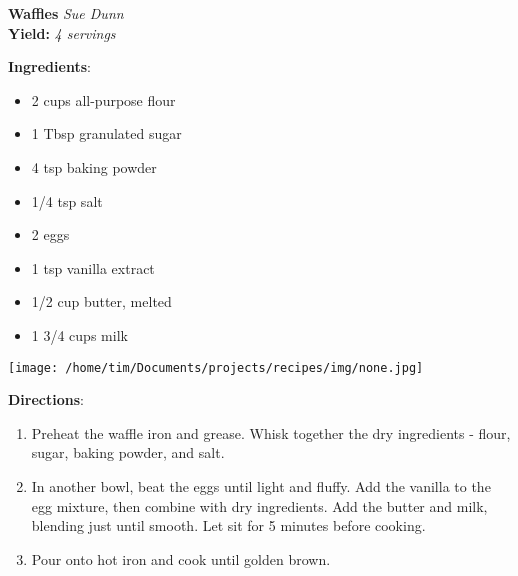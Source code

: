 \documentclass[11pt, twoside, openany]{book}
\begin{document}
\noindent\begin{minipage}[t]{\linewidth}%
{\Large\textbf{Waffles}} \label{waffles}\hfill\textit{Sue Dunn}\\
\textbf{Yield:} \textit{4 servings}\\
\noindent\begin{minipage}[t]{0.78\linewidth}%
\textbf{Ingredients}:\vspace{-3mm}
\begin{multicols}{2}
\begin{itemize}\setlength\itemsep{-1mm}
\item 2 cups all-purpose flour
\item 1 Tbsp granulated sugar
\item 4 tsp baking powder
\item 1/4 tsp salt
\item 2 eggs
\item 1 tsp vanilla extract
\item 1/2 cup butter, melted
\item 1 3/4 cups milk
\end{itemize}
\end{multicols}
\end{minipage}
\noindent\begin{minipage}[t]{0.18\linewidth}
\centering \strut\vspace*{-\baselineskip}\newline
\texttt{[image: /home/tim/Documents/projects/recipes/img/none.jpg]}\\
\end{minipage}\vspace{3mm}
\textbf{Directions}:
\vspace{-3mm}\begin{enumerate}\setlength\itemsep{-1mm}
\item Preheat the waffle iron and grease. Whisk together the dry ingredients - flour, sugar, baking powder, and salt.
\item In another bowl, beat the eggs until light and fluffy. Add the vanilla to the egg mixture, then combine with dry ingredients. Add the butter and milk, blending just until smooth. Let sit for 5 minutes before cooking.
\item Pour onto hot iron and cook until golden brown.
\end{enumerate}
\end{minipage}\vspace{8mm}
\end{document}
